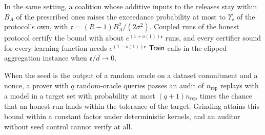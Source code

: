 \begin{theorem}
In the same setting, a coalition whose additive inputs to the releases stay
within $B_A$ of the prescribed ones raises the exceedance probability at most to
$\Upsilon_{\mathfrak e}$ of the protocol's own, with
$\mathfrak e=(R-1)B_A^2/(2\sigma^2)$. Coupled runs of the honest protocol certify the
bound with about $e^{(1+o(1))\mathfrak e}$ runs, and every certifier sound for every
learning function needs $e^{(1-o(1))\mathfrak e}$ $\mathsf{Train}$ calls in the clipped
aggregation instance when $\mathfrak e/d\to0$.
\end{theorem}

\begin{theorem}
When the seed is the output of a random oracle on a dataset commitment and a
nonce, a prover with $q$ random-oracle queries passes an audit of $n_{\mathrm{rep}}$
replays with a model in a target set with probability at most
$(q+1)n_{\mathrm{rep}}$ times the chance that an honest run lands within the tolerance
of the target. Grinding attains this bound within a constant factor under
deterministic kernels, and an auditor without seed control cannot verify at all.
\end{theorem}

